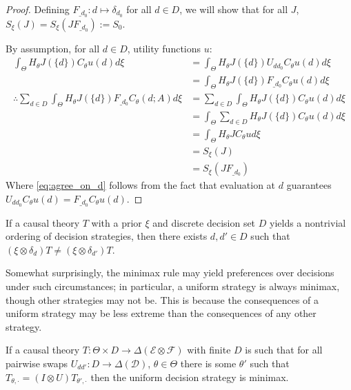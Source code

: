 \begin{proof}
Defining $F_{\_d_0}:d\mapsto \delta_{d_0}$ for all $d\in D$, we will show that for all $J$, $S_\xi(J)=S_\xi(JF_{\_d_0}):=S_0$.

By assumption, for all $d\in D$, utility functions $u$:
\begin{align}
	\int_\Theta H_\theta J(\{d\}) C_\theta u(d) d\xi &= \int_\Theta H_\theta J(\{d\}) U_{dd_0} C_\theta u(d) d\xi\\
													 &= \int_\Theta H_\theta J(\{d\}) F_{\_d_0} C_\theta u(d) d\xi\label{eq:agree_on_d}\\
\therefore \sum_{d\in D} \int_\Theta H_\theta J(\{d\}) F_{\_d_0} C_\theta(d;A) d\xi &= \sum_{d\in D} \int_\Theta H_\theta J(\{d\}) C_\theta u(d) d\xi\\
													 &= \int_\Theta \sum_{d\in D} H_\theta J(\{d\}) C_\theta u (d) d\xi\\
													 &= \int_\Theta H_\theta J C_\theta u d\xi\\
													 &= S_\xi(J)\\
													 &= S_\xi(JF_{\_d_0})
\end{align}
Where \ref{eq:agree_on_d} follows from the fact that evaluation at $d$ guarantees $U_{dd_0} C_\theta u(d) = F_{\_d_0} C_\theta u(d)$.
\end{proof}

\begin{corollary}
If a causal theory $T$ with a prior $\xi$ and discrete decision set $D$ yields a nontrivial ordering of decision strategies, then there exists $d,d'\in D$ such that $(\xi\otimes \delta_d) T\neq (\xi\otimes \delta_{d'}) T$.
\end{corollary}

Somewhat surprisingly, the minimax rule may yield preferences over decisions under such circumstances; in particular, a uniform strategy is always minimax, though other strategies may not be. This is because the consequences of a uniform strategy may be less extreme than the consequences of any other strategy.

\begin{theorem}
If a causal theory $T:\Theta\times D\to \Delta(\mathcal{E}\otimes\mathcal{F})$ with finite $D$ is such that for all pairwise swaps $U_{dd'}:D\to \Delta(\mathcal{D})$, $\theta\in \Theta$ there is some $\theta'$ such that $T_{\theta,\cdot} = (I\otimes U)T_{\theta',\cdot}$ then the uniform decision strategy is minimax.
\end{theorem}

